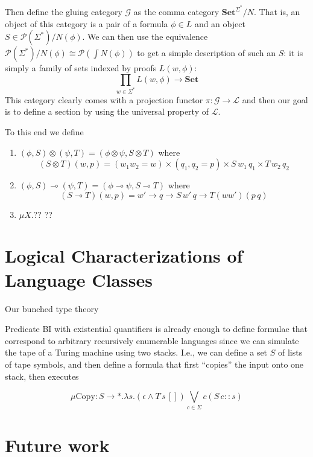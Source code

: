 \documentclass[sigconf,anonymous,review,screen]{acmart}
\newcommand{\Set}{\mathbf{Set}}
\newif\ifdraft
\newcommand{\pedro}[1]{\ifdraft{\color{red}[{\bf Pedro}: #1]}\fi}
\begin{document}
Then define the gluing category $\mathcal G$ as the comma category
$\Set^{\Sigma^*}/N$. That is, an object of this category is a pair of
a formula $\phi \in L$ and an object $S \in \mathcal
P(\Sigma^*)/N(\phi)$. We can then use the equivalence $\mathcal
P(\Sigma^*)/N(\phi) \cong \mathcal P(\int N(\phi))$ to get a simple
description of such an $S$: it is simply a family of sets indexed by
proofs $L(w,\phi)$:
\[ \prod_{w\in\Sigma^*} L(w,\phi) \to \Set \]
This category clearly comes with a projection functor $\pi : \mathcal
G \to \mathcal L$ and then our goal is to define a section by using
the universal property of $\mathcal L$.

To this end we define
\pedro{I'm pretty sure that these definitions have been somewhat presented
  in ``Glueing and orthogonality for models of linear logic'' by Hyland and Schalk.
We should probably cite them so that we don't have to rederive their constructions and proofs here.}
\begin{enumerate}
\item $(\phi, S) \otimes (\psi, T) = (\phi \otimes \psi, S\otimes T)$ where
  \[ (S \otimes T)(w, p) = (w_1w_2 = w) \times (q_1,q_2 = p) \times S\,w_1\,q_1 \times T\,w_2\,q_2\]
\item $(\phi, S) \multimap (\psi, T) = (\phi \multimap \psi, S \multimap T)$ where
  \[ (S \multimap T)(w,p) = w' \to q \to S\,w'\,q \to T (ww') (p\,q) \]
\item $\mu X. ??$ ??
\end{enumerate}

\section{Logical Characterizations of Language Classes}

Our bunched type theory 

Predicate BI with existential quantifiers is already enough to define
formulae that correspond to arbitrary recursively enumerable languages
since we can simulate the tape of a Turing machine using two
stacks. I.e., we can define a set $S$ of lists of tape symbols, and
then define a formula that first ``copies'' the input onto one stack, then executes

\[ \mu \textrm{Copy} : S \to *. \lambda s. (\epsilon \wedge T\,s\,[])\bigvee_{c \in \Sigma} c (S\,{c::s}) \]



\section{Future work}
\end{document}
